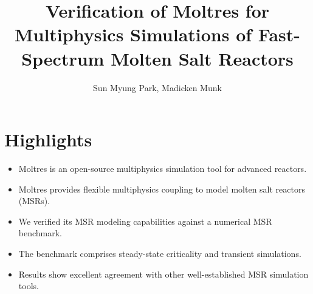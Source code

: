 \documentclass[review]{elsarticle}
\begin{document}
\begin{frontmatter}
\title{Verification of Moltres for Multiphysics Simulations of Fast-Spectrum Molten Salt Reactors}
\author{Sun Myung Park, Madicken Munk}
\end{frontmatter}
\section*{Highlights}
\begin{itemize}
       \item Moltres is an open-source multiphysics simulation tool for advanced reactors.
       \item Moltres provides flexible multiphysics coupling to model molten salt reactors (MSRs).
       \item We verified its MSR modeling capabilities against a numerical MSR benchmark.
       \item The benchmark comprises steady-state criticality and transient simulations.
       \item Results show excellent agreement with other well-established MSR simulation tools.
\end{itemize}
\end{document}

